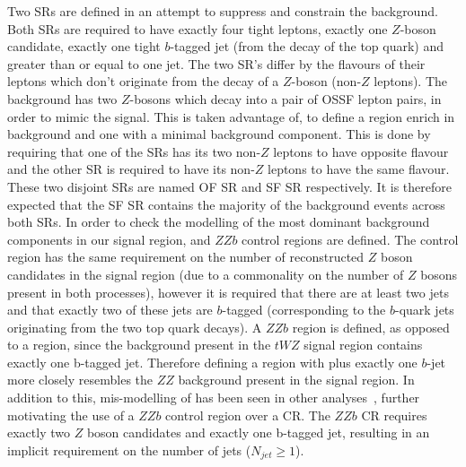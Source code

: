 Two \tWZ SRs are defined in an attempt to suppress and constrain the \ZZ background. Both \tWZ SRs are required to have exactly four tight leptons, exactly one $Z$-boson candidate, exactly one tight $b$-tagged jet (from the decay of the top quark) and greater than or equal to one jet. The two \tWZ SR's differ by the flavours of their leptons which don't originate from the decay of a $Z$-boson (non-$Z$ leptons). The \ZZ background has two $Z$-bosons which decay into a pair of OSSF lepton pairs, in order to mimic the \tWZ signal. This is taken advantage of, to define a \tWZ region enrich in \ZZ background and one with a minimal \ZZ background component. This is done by requiring that one of the \tWZ SRs has its two non-$Z$ leptons to have opposite flavour and the other \tWZ SR is required to have its non-$Z$ leptons to have the same flavour. These two disjoint \tWZ SRs are named \tWZ OF SR and \tWZ SF SR respectively. It is therefore expected that the \tWZ SF SR contains the majority of the \ZZ background events across both \tWZ SRs. In order to check the modelling of the most dominant background components in our signal region, \ttZ and $ZZb$ control regions are defined. The \ttZ control region has the same requirement on the number of reconstructed $Z$ boson candidates in the signal region (due to a commonality on the number of $Z$ bosons present in both processes), however it is required that there are at least two jets and that exactly two of these jets are $b$-tagged (corresponding to the $b$-quark jets originating from the two top quark decays). A $ZZb$ region is defined, as opposed to a \ZZ region, since the \ZZ background present in the $tWZ$ signal region contains exactly one b-tagged jet. Therefore defining a region with \ZZ plus exactly one $b$-jet more closely resembles the $ZZ$ background present in the signal region. In addition to this, mis-modelling of \ZZ has been seen in other analyses~\cite{Aaboud:2019, ppToZZ:CMSpaper}, further motivating the use of a $ZZb$ control region over a \ZZ CR. The $ZZb$ CR requires exactly two $Z$ boson candidates and exactly one b-tagged jet, resulting in an implicit requirement on the number of jets ($N_{jet} \geq 1$).\\


